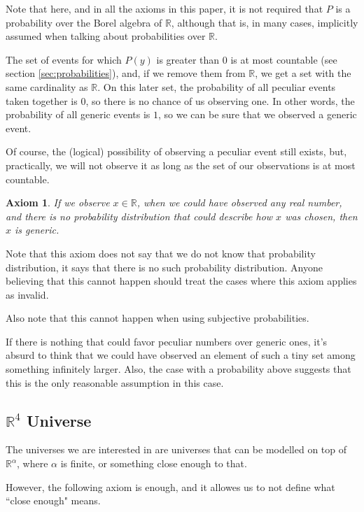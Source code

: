 \documentclass[a4paper
,draft
]{article}
\def\reale{\mathbb{R}}
\newcommand{\ghilimele}[1]{``#1"}
\newtheorem{axiom}{Axiom}
\begin{document}
Note that here, and in all the axioms in this paper, it is not required that
$P$ is a probability over the
Borel algebra of $\reale$, although that is, in many cases, implicitly
assumed when talking about probabilities over $\reale$.

The set of events for which $P(y)$ is
greater than $0$ is at most countable (see section \ref{sec:probabilities}),
and, if we remove them from $\reale$, we
get a set with the same cardinality as $\reale$.
On this later set, the probability
of all peculiar events taken together is $0$, so there is no chance of us
observing one.
In other words, the probability of all generic events is $1$,
so we can be sure that we observed a generic event.

Of course, the (logical) possibility of observing a peculiar event still exists,
but, practically, we will not observe it as long as the set of our
observations is at most countable.

\begin{axiom}\label{ax:noprobability}
  If we observe $x\in\reale$, when we could have
  observed any real number, and there is no probability distribution that could
  describe how $x$ was chosen, then $x$ is generic.
\end{axiom}

Note that this axiom does not say that we do not know that probability
distribution, it says that there is no such probability distribution.
Anyone believing that this cannot happen should treat the cases where
this axiom applies as invalid.

Also note that this cannot happen when using subjective probabilities.

If there is nothing that could favor
peculiar numbers over generic ones, it's absurd to think that we could have
observed an element of such a tiny set among something infinitely larger.
Also, the case with a probability above suggests that this is the only
reasonable assumption in this case.

\subsection{$\reale^4$ Universe}

The universes we are interested in are universes that can be
modelled on top of $\reale^\alpha$, where $\alpha$ is finite,
or something close enough to that.

However, the following axiom is enough, and it allowes us to not define
what \ghilimele{close enough} means.
\end{document}
